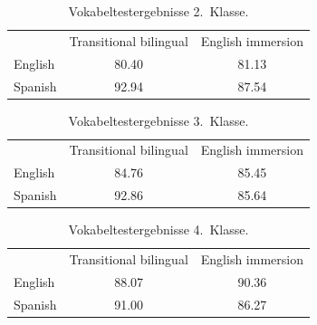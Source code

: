 \documentclass[oneside, 10pt]{book}\usepackage[]{graphicx}\usepackage[]{xcolor}
\begin{document}
\begin{table}[h]
\centering

\caption{Vokabeltestergebnisse 2.\ Klasse.}
\label{slavin_2}
\begin{tabular}{@{}lcc@{}}
            & Transitional bilingual  & English immersion \\
 English    & 80.40                        & 81.13 \\
 Spanish    & 92.94                        & 87.54
\end{tabular}

\end{table}
\begin{table}[h]
\centering
\caption{Vokabeltestergebnisse 3.\ Klasse.}
\label{slavin_3}
\begin{tabular}{@{}lcc@{}}
            & Transitional bilingual  & English immersion \\
 English    & 84.76                        &  85.45\\
 Spanish    & 92.86                        & 85.64
\end{tabular}
\end{table}

\begin{table}[h!]
\centering
\caption{Vokabeltestergebnisse 4.\ Klasse.}
\label{slavin_4}
\begin{tabular}{@{}lcc@{}}
            & Transitional bilingual  & English immersion \\
 English    & 88.07                        &  90.36\\
 Spanish    & 91.00                        & 86.27
\end{tabular}
\end{table}
\end{document}

